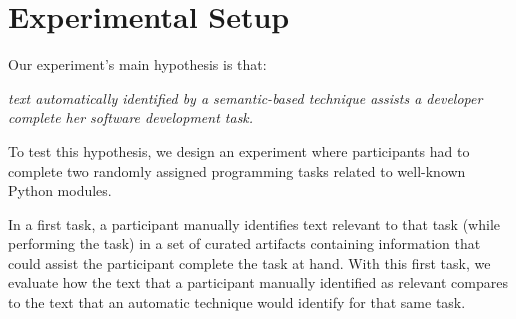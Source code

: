 \clearpage

\section{Experimental Setup}
\label{cp6:procedures}



Our experiment's main hypothesis is that:


\medskip
\begin{bluequote}
    \textit{text automatically identified by a semantic-based technique assists a 
    developer complete her software development task.} 
\end{bluequote}



To test this hypothesis, we design an experiment where  participants
 had to complete two randomly assigned programming tasks related to well-known Python modules. 

 
 


In a first task, a participant manually identifies text relevant to that task (while performing the task)
in a set of curated artifacts containing information that could assist the participant complete the task at hand.
With this first task, we evaluate how the text that a participant manually identified as relevant
compares to the text that an automatic technique would identify for that same task. 



